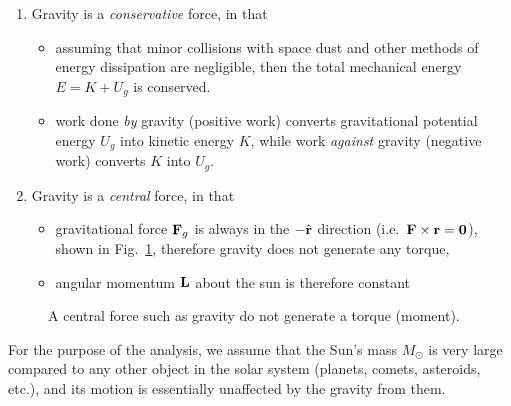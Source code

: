 \documentclass[11pt]{article}
\newcommand{\mb}[1]{
  \ensuremath\mathbf{#1}
}
\begin{document}
\begin{enumerate}[leftmargin=18pt,topsep=0pt]
\item Gravity is a \emph{conservative} force, in that
  \begin{itemize}[leftmargin=15pt,noitemsep,topsep=0pt]
  \item assuming that minor collisions with space dust and other methods of
    energy dissipation are negligible, then the total mechanical energy
    $E=K+U_g$ is conserved.
  \item work done \emph{by} gravity (positive work) converts gravitational
    potential energy $U_g$ into kinetic energy $K$, while work \emph{against}
    gravity (negative work) converts $K$ into $U_g$.
  \end{itemize}
\item Gravity is a \emph{central} force, in that
  \begin{itemize}[leftmargin=15pt,noitemsep,topsep=0pt]
  \item gravitational force $\mb{F}_g$ is always in the $-\hat{\mb{r}}$
    direction (i.e.\ $\mb{F}\times\mb{r}=\mb{0}$), shown in
    Fig.~\ref{central-force}, therefore gravity does not generate any torque,
  \item angular momentum $\mb{L}$ about the sun is therefore constant
  \end{itemize}
\end{enumerate}
\begin{figure}[!ht]
  \centering
  \caption{A central force such as gravity do not generate a torque (moment).}
  \label{central-force}
\end{figure}
For the purpose of the analysis, we assume that the Sun's mass $M_\odot$
is very large compared to any other object in the solar system (planets,
comets, asteroids, etc.), and its motion is essentially unaffected by the
gravity from them.
\end{document}
